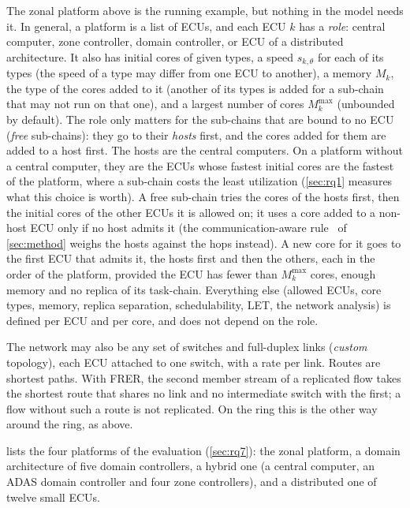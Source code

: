 The zonal platform above is the running example, but nothing in the
model needs it. In general, a platform is a list of ECUs, and each ECU
$k$ has a \emph{role}: central computer, zone controller, domain
controller, or ECU of a distributed architecture. It also has initial
cores of given types, a speed $s_{k,\theta}$ for each of its types
(the speed of a type may differ from one ECU to another), a memory $M_k$,
the type of the cores added to it (another of its types is added for a
sub-chain that may not run on that one), and a largest number of
cores $M^{\max}_k$ (unbounded by default). The role only matters for the
sub-chains that are bound to no ECU (\emph{free} sub-chains): they go to
their \emph{hosts} first, and the cores added for them are added to a
host first. The hosts are the central computers. On a platform without a
central computer, they are the ECUs whose fastest initial cores are the
fastest of the platform, where a sub-chain costs the least utilization
(\cref{sec:rq1} measures what this choice is worth). A free sub-chain
tries the cores of the hosts first, then the initial cores of the other
ECUs it is allowed on; it uses a core added to a non-host ECU only if no
host admits it (the communication-aware rule \CADU\ of \cref{sec:method}
weighs the hosts against the hops instead). A new
core for it goes to the first ECU that admits it, the hosts first and then
the others, each in the order of the platform, provided the ECU has fewer
than $M^{\max}_k$ cores, enough memory and no replica of its task-chain.
Everything else (allowed ECUs, core types,
memory, replica separation, schedulability, LET, the network analysis)
is defined per ECU and per core, and does not depend on the role.

The network may also be any set of switches and full-duplex links
(\emph{custom} topology), each ECU attached to one switch, with a rate per
link. Routes are shortest paths. With FRER, the second member stream of a
replicated flow takes the shortest route that shares no link and no
intermediate switch with the first; a flow without such a route is not
replicated. On the ring this is the other way around the ring, as above.

 lists the four platforms of the evaluation
(\cref{sec:rq7}): the zonal platform, a domain architecture of five
domain controllers, a hybrid one (a central computer, an ADAS domain
controller and four zone controllers), and a distributed one of twelve
small ECUs.

